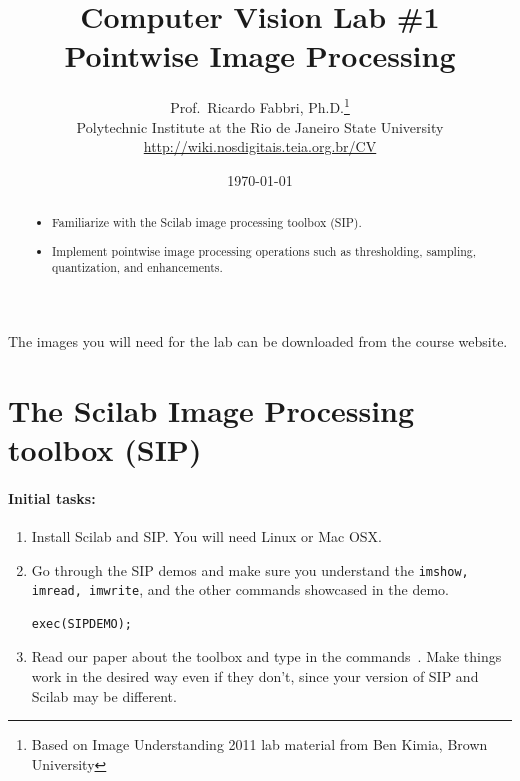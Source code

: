 \documentclass[a4paper]{article}
\begin{document}
\title{\textsf{Computer Vision Lab \#1\\ Pointwise Image Processing}
} 

\author{Prof.\ Ricardo Fabbri, Ph.D.\footnote{Based on Image Understanding
2011 lab material from Ben Kimia, Brown University}\\[1em]
Polytechnic Institute at the Rio de Janeiro State University\\
\url{http://wiki.nosdigitais.teia.org.br/CV}
}
 

\date{\today}
\maketitle
\begin{abstract}
\noindent\begin{itemize}
\item Familiarize with the Scilab image
processing toolbox (SIP).
\item Implement pointwise image processing operations such as thresholding,
sampling, quantization, and enhancements.
\end{itemize}
\end{abstract}
\vspace{2em}



The images you will need for the lab can be downloaded from the course
website.

\section{The Scilab Image Processing toolbox (SIP)}

\paragraph{Initial tasks:}
\begin{enumerate}
\item Install Scilab and SIP. You will need Linux or Mac OSX.
\item Go through the SIP demos and make sure you understand the \texttt{imshow, imread,
imwrite}, and the other commands showcased in the demo.
\begin{lstlisting}[numbers=none]
exec(SIPDEMO);
\end{lstlisting}
\item Read our paper about the toolbox and type in the commands~\cite{SIP}.
Make things work in the desired way even if they don't, since your version of
SIP and Scilab may be different.
\end{enumerate}
\end{document}
